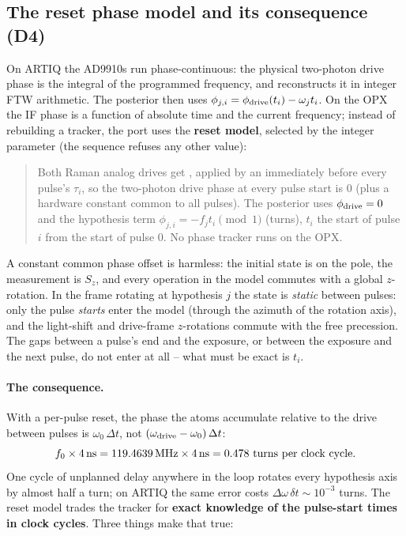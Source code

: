 \subsection{The reset phase model and its consequence (D4)}
\label{sec:feedback:phase}

On ARTIQ the AD9910s run phase-continuous: the physical two-photon drive
phase is the integral of the programmed frequency, and
 reconstructs it in integer
FTW arithmetic. The posterior then uses $\phi_{j,i} = \phi_{\rm drive}(t_i) -
\omega_j t_i$. On the OPX the IF phase is a function of absolute time and the
current frequency; instead of rebuilding a tracker, the port uses the
\textbf{reset model}, selected by the integer parameter
 (the sequence refuses any other
value):

\begin{quote}
Both Raman analog drives get , applied by an
 immediately before every
pulse's $\tau_i$\code{)}, so the
two-photon drive phase at every pulse start is 0 (plus a hardware constant
common to all pulses). The posterior uses $\phi_{\rm drive} = 0$ and the
hypothesis term $\phi_{j,i} = -f_j t_i \pmod 1$ (turns), $t_i$ the start of
pulse $i$ from the start of pulse 0. No phase tracker runs on the OPX.
\end{quote}

A constant common phase offset is harmless: the initial state is on the
pole, the measurement is $S_z$, and every operation in the model commutes
with a global $z$-rotation. In the frame rotating at hypothesis $j$ the state
is \emph{static} between pulses: only the pulse \emph{starts} enter the model
(through the azimuth of the rotation axis), and the light-shift and
drive-frame $z$-rotations commute with the free precession. The gaps between
a pulse's end and the exposure, or between the exposure and the next pulse,
do not enter at all -- what must be exact is $t_i$.

\paragraph{The consequence.} With a per-pulse reset, the phase the atoms
accumulate relative to the drive between pulses is $\omega_0\,\Delta t$, not
$(\omega_{\rm drive} - \omega_0)\,\Delta t$:
\[
  f_0 \times 4\,\mathrm{ns} = 119.4639\,\mathrm{MHz} \times 4\,\mathrm{ns} = 0.478\ \text{turns per clock cycle}.
\]
One cycle of unplanned delay anywhere in the loop rotates every hypothesis
axis by almost half a turn; on ARTIQ the same error costs $\Delta\omega\,\delta
t \sim 10^{-3}$ turns. The reset model trades the tracker for \textbf{exact
knowledge of the pulse-start times in clock cycles}. Three things make that
true:


